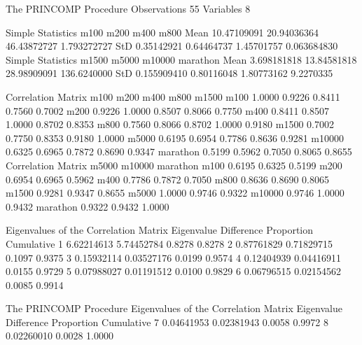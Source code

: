 \documentclass{article}
\begin{document}
\begin{Woutput}
The PRINCOMP Procedure
Observations          55
Variables              8

                         Simple Statistics
                m100            m200            m400            m800
Mean     10.47109091     20.94036364     46.43872727     1.793272727
StD       0.35142921      0.64464737      1.45701757     0.063684830
                         Simple Statistics
               m1500           m5000          m10000        marathon
Mean     3.698181818     13.84581818     28.98909091     136.6240000
StD      0.155909410      0.80116048      1.80773162       9.2270335

                         Correlation Matrix
                m100        m200        m400        m800       m1500
m100          1.0000      0.9226      0.8411      0.7560      0.7002
m200          0.9226      1.0000      0.8507      0.8066      0.7750
m400          0.8411      0.8507      1.0000      0.8702      0.8353
m800          0.7560      0.8066      0.8702      1.0000      0.9180
m1500         0.7002      0.7750      0.8353      0.9180      1.0000
m5000         0.6195      0.6954      0.7786      0.8636      0.9281
m10000        0.6325      0.6965      0.7872      0.8690      0.9347
marathon      0.5199      0.5962      0.7050      0.8065      0.8655
              Correlation Matrix
               m5000      m10000      marathon
m100          0.6195      0.6325        0.5199
m200          0.6954      0.6965        0.5962
m400          0.7786      0.7872        0.7050
m800          0.8636      0.8690        0.8065
m1500         0.9281      0.9347        0.8655
m5000         1.0000      0.9746        0.9322
m10000        0.9746      1.0000        0.9432
marathon      0.9322      0.9432        1.0000

            Eigenvalues of the Correlation Matrix
        Eigenvalue    Difference    Proportion    Cumulative
   1    6.62214613    5.74452784        0.8278        0.8278
   2    0.87761829    0.71829715        0.1097        0.9375
   3    0.15932114    0.03527176        0.0199        0.9574
   4    0.12404939    0.04416911        0.0155        0.9729
   5    0.07988027    0.01191512        0.0100        0.9829
   6    0.06796515    0.02154562        0.0085        0.9914

The PRINCOMP Procedure
            Eigenvalues of the Correlation Matrix
        Eigenvalue    Difference    Proportion    Cumulative
   7    0.04641953    0.02381943        0.0058        0.9972
   8    0.02260010                      0.0028        1.0000


\end{Woutput}
\end{document}
